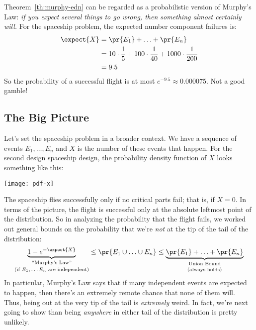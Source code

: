 \begin{editingnotes}
Theorem~\ref{th:murphy-edn} can be regarded as a probabilistic version
of Murphy's Law: \textit{if you expect several things to go wrong,
  then something almost certainly will.}  For the spaceship problem,
the expected number component failures is:
%
\begin{align*}
\expect{X}
    & = \pr{E_1} + \ldots + \pr{E_n} \\
    & = 10 \cdot \frac{1}{5} + 100 \cdot \frac{1}{40}
        + 1000 \cdot \frac{1}{200} \\
    & = 9.5
\end{align*}
%
So the probability of a successful flight is at most $e^{-9.5} \approx
0.000075$.  Not a good gamble!

\subsection{The Big Picture}

Let's set the spaceship problem in a broader context.  We have a
sequence of events $E_1, \ldots, E_n$ and $X$ is the number of these
events that happen.  For the second design spaceship design, the
probability density function of $X$ looks something like this:
%
\begin{center}
\texttt{[image: pdf-x]}
\end{center}
%
The spaceship flies successfully only if no critical parts fail; that
is, if $X = 0$.  In terms of the picture, the flight is successful
only at the absolute leftmost point of the distribution.  So in
analyzing the probability that the flight fails, we worked out general
bounds on the probability that we're \textit{not} at the tip of the
tail of the distribution:
%
\[
\underbrace{1 - e^{-\expect{X}}}_{
  \substack{\text{``Murphy's Law''} \\[0.5ex]
            \text{(if $E_1, \ldots E_n$ are independent)}}}
\leq \pr{E_1 \cup \ldots \cup E_n} \leq
\underbrace{\pr{E_1} + \ldots + \pr{E_n}}_{
  \substack{\text{Union Bound} \\[0.5ex]
            \text{(always holds)}}}
\]
%
In particular, Murphy's Law says that if many independent events are
expected to happen, then there's an extremely remote chance that none
of them will.  Thus, being out at the very tip of the tail is
\textit{extremely} weird.  In fact, we're next going to show than
being \textit{anywhere} in either tail of the distribution is pretty
unlikely.



\end{editingnotes}
